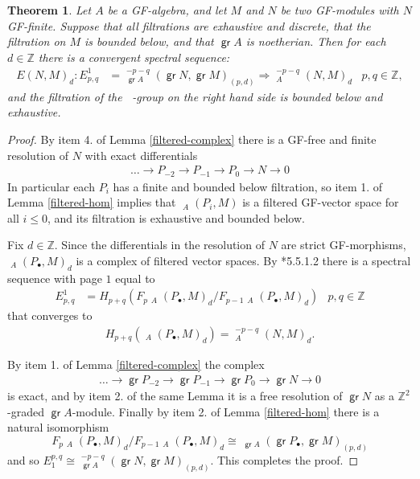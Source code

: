 \documentclass[11pt,fleqn]{article}
\theoremstyle{plain}
\newtheorem{Theorem}{Theorem}[section]
\theoremstyle{remark}
\theoremstyle{definition}
\newcommand\ZZ{\mathbb Z}
\renewcommand\to{\longrightarrow}
\DeclareMathOperator\GrHom{\underline{\mathsf{Hom}}}
\DeclareMathOperator\GrExt{\underline{\mathsf{Ext}}}
\DeclareMathOperator\gr{\mathsf{gr}}
\begin{document}
\begin{Theorem}
\label{ext-ss}
	 Let $A$ be a GF-algebra, and let $M$ and $N$ be two GF-modules with $N$ GF-finite.
	 Suppose that all filtrations are exhaustive and discrete, that the filtration on
	 $M$ is bounded below, and that $\gr A$ is noetherian. Then for each $d \in \ZZ$ 
	 there is a convergent spectral sequence:
	\begin{align*}
		E(N,M)_d: E_{p,q}^1 &= \GrExt_{\gr A}^{-p-q}(\gr N, \gr
		M)_{(p,d)} \Rightarrow \GrExt_A^{-p-q}(N,M)_d &p,q \in \ZZ,
	\end{align*}
	and the filtration of the $\GrExt$-group on the right hand side is
	bounded below and exhaustive. 
\end{Theorem}
\begin{proof}
 	By item 4. of Lemma \ref{filtered-complex} there is a GF-free and finite
	resolution of $N$ with exact differentials
	\begin{align*}
		 \ldots \to P_{-2} \to P_{-1} \to P_{0} \to N \to 0
	\end{align*}
	In particular each $P_i$ has a finite and bounded below filtration, so item 1. of
	Lemma \ref{filtered-hom} implies that $\GrHom_A(P_{i},M)$ is a filtered	GF-vector
	space for all $i \leq 0$, and its filtration is exhaustive and bounded below. 
	
	Fix $d \in \ZZ$. Since the differentials in the resolution of $N$ are strict
	GF-morphisms, $\GrHom_A(P_\bullet,M)_d$ is a complex of filtered vector spaces. By
	\cite{W}*{5.5.1.2} there is a spectral sequence with page $1$ equal to
	\begin{align*}
		 E_{p,q}^1 &= H_{p+q}(F_p \GrHom_A(P_\bullet,M)_d / F_{p-1}
		 \GrHom_A(P_\bullet,M)_d) & p,q \in \ZZ
	\end{align*}
	that converges to 	
	\begin{align*}
		 H_{p+q}(\GrHom_{A}(P_\bullet,M)_d) = \GrExt^{-p-q}_A(N,M)_d.
	\end{align*}
	
	By item 1. of Lemma \ref{filtered-complex} the complex
	\begin{align*}
		 \ldots \to \gr P_{-2} \to \gr P_{-1} \to \gr P_{0} \to \gr N \to 0
	\end{align*}
	is exact, and by item 2. of the same Lemma it is a free resolution of $\gr N$ as a
	$\ZZ^2$-graded $\gr A$-module. Finally by item 2. of Lemma \ref{filtered-hom}
	there is a natural isomorphism
	$$F_p\GrHom_A(P_\bullet,M)_d/F_{p-1}\GrHom_A(P_\bullet,M)_d \cong \GrHom_{\gr A}
	(\gr P_\bullet,\gr M)_{(p,d)}$$ 
	and so $E_1^{p,q} \cong \GrExt_{\gr A}^{-p-q}(\gr N, \gr M)_{(p,d)}$. This
	completes the proof.
\end{proof}
\end{document}
